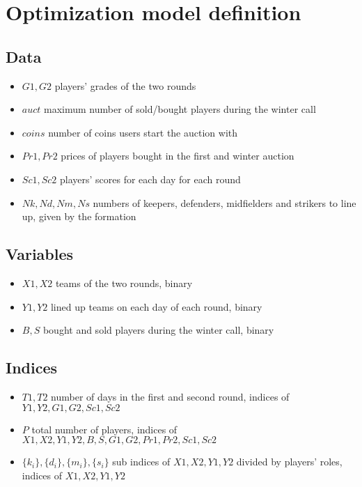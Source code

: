 \documentclass[a4paper,10pt]{article}
\theoremstyle{definition}
\theoremstyle{plain}
\begin{document}
	
\section{Optimization model definition}

\subsection{Data}

\begin{itemize}
	\item $G1, G2$ players' grades of the two rounds
	\item $auct$ maximum number of sold/bought players during the winter call
	\item $coins$ number of coins users start the auction with
	\item $Pr1, Pr2$ prices of players bought in the first and winter auction
	\item $Sc1, Sc2$ players' scores for each day for each round
	\item $Nk, Nd, Nm, Ns$ numbers of keepers, defenders, midfielders and strikers to line up, given by the formation
\end{itemize}
\subsection{Variables}

\begin{itemize}
	\item $X1, X2$ teams of the two rounds, binary
	\item $Y1, Y2$ lined up teams on each day of each round, binary
	\item $B, S$ bought and sold players during the winter call, binary
\end{itemize}
\subsection{Indices}

\begin{itemize}
	\item $T1, T2$ number of days in the first and second round, indices of $Y1, Y2, G1, G2, Sc1, Sc2$
	\item $P$ total number of players, indices of $X1, X2, Y1, Y2, B, S, G1, G2, Pr1, Pr2, Sc1, Sc2$
	\item $\{k_i\}, \{d_i\}, \{m_i\}, \{s_i\}$ sub indices of $X1, X2, Y1, Y2$ divided by players' roles, indices of $X1, X2, Y1, Y2$
\end{itemize}
\end{document}
